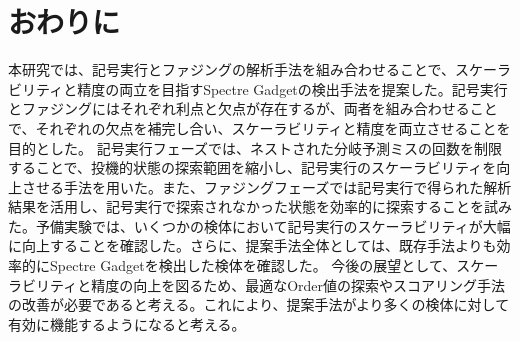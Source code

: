 \section{おわりに}
本研究では、記号実行とファジングの解析手法を組み合わせることで、スケーラビリティと精度の両立を目指すSpectre Gadgetの検出手法を提案した。記号実行とファジングにはそれぞれ利点と欠点が存在するが、両者を組み合わせることで、それぞれの欠点を補完し合い、スケーラビリティと精度を両立させることを目的とした。
記号実行フェーズでは、ネストされた分岐予測ミスの回数を制限することで、投機的状態の探索範囲を縮小し、記号実行のスケーラビリティを向上させる手法を用いた。また、ファジングフェーズでは記号実行で得られた解析結果を活用し、記号実行で探索されなかった状態を効率的に探索することを試みた。予備実験では、いくつかの検体において記号実行のスケーラビリティが大幅に向上することを確認した。さらに、提案手法全体としては、既存手法よりも効率的にSpectre Gadgetを検出した検体を確認した。
今後の展望として、スケーラビリティと精度の向上を図るため、最適なOrder値の探索やスコアリング手法の改善が必要であると考える。これにより、提案手法がより多くの検体に対して有効に機能するようになると考える。


